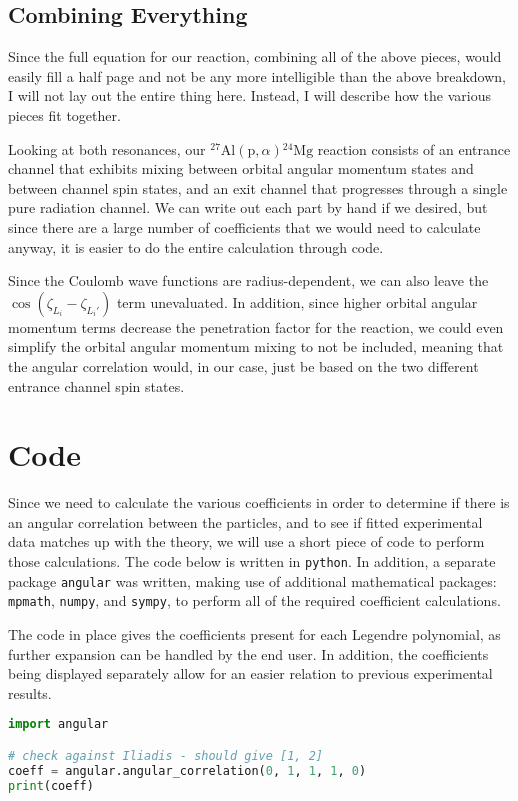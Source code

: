 \documentclass[10pt]{amsart}
\numberwithin{equation}{subsection}
\newcommand{\mnuc}[2]{{}^{#1}\textrm{#2}}
\newcommand{\react}[4]{$#1(#2,#3)#4$}
\newcommand{\alpa}{\react{\mnuc{27}{Al}}{\textrm{p}}{\alpha}{\mnuc{24}{Mg}}}
\begin{document}
\subsection{Combining Everything}

Since the full equation for our reaction, combining all of the above pieces,
would easily fill a half page and not be any more intelligible than the above
breakdown, I will not lay out the entire thing here. Instead, I will describe
how the various pieces fit together.

Looking at both resonances, our \alpa{} reaction consists of an entrance
channel that exhibits mixing between orbital angular momentum states and
between channel spin states, and an exit channel that progresses through a
single pure radiation channel. We can write out each part by hand if we
desired, but since there are a large number of coefficients that we would need
to calculate anyway, it is easier to do the entire calculation through code.

Since the Coulomb wave functions are radius-dependent, we can also leave the
$\cos(\zeta_{L_i} - \zeta_{L_i'})$ term unevaluated. In addition, since higher
orbital angular momentum terms decrease the penetration factor for the
reaction, we could even simplify the orbital angular momentum mixing to not be
included, meaning that the angular correlation would, in our case, just be
based on the two different entrance channel spin states.


\section{Code}

Since we need to calculate the various coefficients in order to determine if
there is an angular correlation between the particles, and to see if fitted
experimental data matches up with the theory, we will use a short piece of code
to perform those calculations. The code below is written in \texttt{python}. In
addition, a separate package \verb+angular+ was written, making use of
additional mathematical packages: \verb+mpmath+, \verb+numpy+, and
\verb+sympy+, to perform all of the required coefficient calculations.

The code in place gives the coefficients present for each Legendre polynomial,
as further expansion can be handled by the end user. In addition, the
coefficients being displayed separately allow for an easier relation to
previous experimental results.

\vspace{1.5em}
\begin{lstlisting}[language=Python]
import angular

# check against Iliadis - should give [1, 2]
coeff = angular.angular_correlation(0, 1, 1, 1, 0)
print(coeff)
\end{lstlisting}
\end{document}
